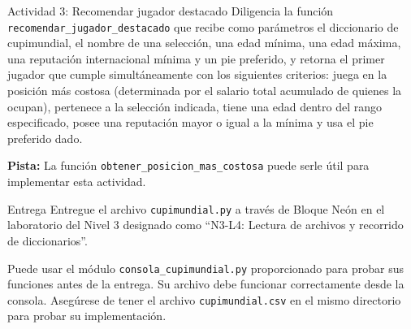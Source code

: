 \documentclass{ip-lab}
\begin{document}
\begin{sectionbox}{Actividad 3: Recomendar jugador destacado}
  Diligencia la función \texttt{recomendar\_jugador\_destacado} que recibe como parámetros el diccionario de cupimundial, el nombre de una selección, una edad mínima, una edad máxima, una reputación internacional mínima y un pie preferido, y retorna el primer jugador que cumple simultáneamente con los siguientes criterios: juega en la posición más costosa (determinada por el salario total acumulado de quienes la ocupan), pertenece a la selección indicada, tiene una edad dentro del rango especificado, posee una reputación mayor o igual a la mínima y usa el pie preferido dado.

  \textbf{Pista:} La función \texttt{obtener\_posicion\_mas\_costosa} puede serle útil para implementar esta actividad.
\end{sectionbox}

\begin{sectionbox}{Entrega}
Entregue el archivo \texttt{cupimundial.py} a través de Bloque Neón en el laboratorio del Nivel 3 designado como ``N3-L4: Lectura de archivos y recorrido de diccionarios''.

Puede usar el módulo \texttt{consola\_cupimundial.py} proporcionado para probar sus funciones antes de la entrega. Su archivo debe funcionar correctamente desde la consola. Asegúrese de tener el archivo \texttt{cupimundial.csv} en el mismo directorio para probar su implementación.
\end{sectionbox}
\end{document}
